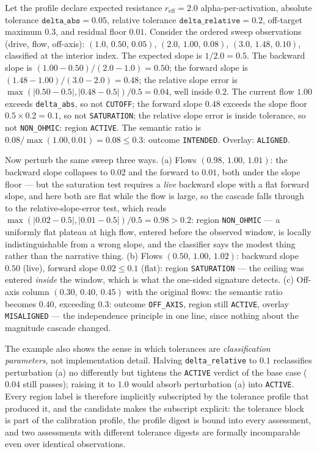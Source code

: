 \begin{example}\label{ch07:ex:sweep}
Let the profile declare expected resistance $r_{\mathrm{eff}} = 2.0$
alpha-per-activation, absolute tolerance $\texttt{delta\_abs} = 0.05$,
relative tolerance $\texttt{delta\_relative} = 0.2$, off-target maximum
$0.3$, and residual floor $0.01$. Consider the ordered sweep
observations (drive, flow, off-axis): $(1.0,\, 0.50,\, 0.05)$,
$(2.0,\, 1.00,\, 0.08)$, $(3.0,\, 1.48,\, 0.10)$, classified at the
interior index. The expected slope is $1/2.0 = 0.5$. The backward slope
is $(1.00 - 0.50)/(2.0 - 1.0) = 0.50$; the forward slope is
$(1.48 - 1.00)/(3.0 - 2.0) = 0.48$; the relative slope error is
$\max(|0.50 - 0.5|, |0.48 - 0.5|)/0.5 = 0.04$, well inside $0.2$. The
current flow $1.00$ exceeds \texttt{delta\_abs}, so not \texttt{CUTOFF};
the forward slope $0.48$ exceeds the slope floor
$0.5 \times 0.2 = 0.1$, so not \texttt{SATURATION}; the relative slope
error is inside tolerance, so not \texttt{NON\_OHMIC}: region
\texttt{ACTIVE}. The semantic ratio is $0.08 / \max(1.00, 0.01) =
0.08 \le 0.3$: outcome \texttt{INTENDED}. Overlay: \texttt{ALIGNED}.

Now perturb the same sweep three ways. (a) Flows
$(0.98,\, 1.00,\, 1.01)$: the backward slope collapses to $0.02$ and
the forward to $0.01$, both under the slope floor --- but the
saturation test requires a \emph{live} backward slope with a flat
forward slope, and here both are flat while the flow is large, so the
cascade falls through to the relative-slope-error test, which reads
$\max(|0.02-0.5|,|0.01-0.5|)/0.5 = 0.98 > 0.2$: region
\texttt{NON\_OHMIC} --- a uniformly flat plateau at high flow, entered
before the observed window, is locally indistinguishable from a wrong
slope, and the classifier says the modest thing rather than the
narrative thing. (b) Flows $(0.50,\, 1.00,\, 1.02)$: backward slope
$0.50$ (live), forward slope $0.02 \le 0.1$ (flat): region
\texttt{SATURATION} --- the ceiling was entered \emph{inside} the
window, which is what the one-sided signature detects. (c) Off-axis
column $(0.30,\, 0.40,\, 0.45)$ with the original flows: the semantic
ratio becomes $0.40$, exceeding $0.3$: outcome \texttt{OFF\_AXIS},
region still \texttt{ACTIVE}, overlay \texttt{MISALIGNED} --- the
independence principle in one line, since nothing about the magnitude
cascade changed.
\end{example}

The example also shows the sense in which tolerances are
\emph{classification parameters}, not implementation detail. Halving
\texttt{delta\_relative} to $0.1$ reclassifies perturbation (a) no
differently but tightens the \texttt{ACTIVE} verdict of the base case
($0.04$ still passes); raising it to $1.0$ would absorb perturbation
(a) into \texttt{ACTIVE}. Every region label is therefore implicitly
subscripted by the tolerance profile that produced it, and the
candidate makes the subscript explicit: the tolerance block is part of
the calibration profile, the profile digest is bound into every
assessment, and two assessments with different tolerance digests are
formally incomparable even over identical observations.

